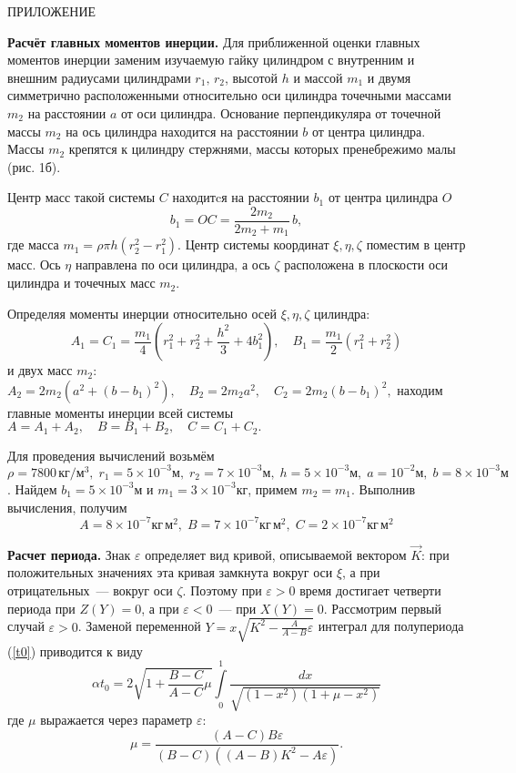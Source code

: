 \documentclass[14pt,a4paper]{extarticle}
\def\DS{\displaystyle}
\def\eps{\varepsilon}
\begin{document}
\smallskip

ПРИЛОЖЕНИЕ

{\bf Расчёт главных моментов инерции.} Для приближенной оценки главных моментов инерции заменим изучаемую гайку цилиндром с внутренним и внешним радиусами цилиндрами $r_1,\,r_2$, высотой $h$ и массой $m_1$ и двумя симметрично расположенными относительно оси цилиндра точечными массами $m_2$ на расстоянии $a$ от оси цилиндра. Основание перпендикуляра от точечной массы $m_2$ на ось цилиндра находится на расстоянии $b$ от центра цилиндра. Массы $m_2$ крепятся к цилиндру стержнями, массы которых пренебрежимо малы (рис. 1б). 

Центр масс такой системы $C$ находитcя на расстоянии $b_1$ от центра цилиндра $O$
$$
b_1=OC=\frac{2m_2}{2m_2+m_1}\,b,
$$
где масса $m_1=\rho\pi h(r_2^2-r_1^2).$
Центр системы координат $\xi,\eta,\zeta$ поместим в центр масс. Ось $\eta$ направлена по оси цилиндра, а ось $\zeta$ расположена в плоскости  оси цилиндра и точечных масс $m_2$. 

Определяя моменты инерции относительно осей $\xi,\eta,\zeta$ цилиндра: 
$$
A_1=C_1=\frac{m_1}{4}(r_1^2+r_2^2+\frac{h^2}{3}+4b_1^2),\quad B_1=\frac{m_1}{2}(r_1^2+r_2^2)
$$
и двух масс $m_2$: $
A_2=2m_2\left(a^2+(b-b_1)^2\right),\quad B_2=2m_2a^2,\quad C_2=2m_2(b-b_1)^2,
$
находим главные моменты инерции всей системы 
$
A=A_1+A_2,\quad B=B_1+B_2,\quad C=C_1+C_2.
$

Для проведения вычислений возьмём $\rho=7800\, кг/м^3,\;r_1=5\times 10^{-3}м,\;r_2=7\times 10^{-3}м,\;h=5\times 10^{-3}м,\;a=10^{-2}м,\;b=8\times 10^{-3}м$. Найдем $b_1=5\times 10^{-3}м$ и $m_1=3\times 10^{-3}кг$, примем $m_2=m_1$.\newline
Выполнив вычисления, получим
$$A=8\times 10^{-7}кг\,м^2,\;B=7\times 10^{-7}кг\,м^2,\;C=2\times 10^{-7}кг\,м^2$$

{\bf Расчет периода.} Знак $\varepsilon$ определяет вид кривой, описываемой вектором $\vec{K}$: при положительных значениях эта кривая замкнута вокруг оси $\xi$, а при отрицательных~--- вокруг оси $\zeta$. Поэтому при $\varepsilon>0$ время достигает четверти периода при $Z(Y)=0$, а при $\varepsilon<0$~--- при $X(Y)=0$. Рассмотрим первый случай $\eps>0$. Заменой переменной 
$
Y=x\sqrt{K^2-\frac{A}{A-B}\eps}
$
интеграл для полупериода (\ref{t0})  приводится к виду
$$
\DS \alpha t_0=2\sqrt{1+\frac{B-C}{A-C}\mu}\int\limits_0^1\frac{dx}{\sqrt{(1-x^2)(1+\mu-x^2)}}
$$
где $\mu$ выражается через параметр $\eps$:
$$\mu =\frac{\left( A-C\right) B\eps}{\left(
B-C\right) \left( \left( A-B\right) K^{2}-A\eps\right) }.$$
\end{document}
